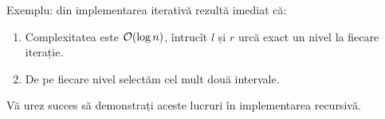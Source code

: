 \documentclass[../main.tex]{subfiles}
\begin{document}
Exemplu: din implementarea iterativă rezultă imediat că:

\begin{enumerate}
  \item  Complexitatea este $\mathcal{O}(\log n)$, întrucît $l$ și $r$ urcă exact un nivel la fiecare iterație.

  \item De pe fiecare nivel selectăm cel mult două intervale.
\end{enumerate}

Vă urez succes să demonstrați aceste lucruri în implementarea recursivă. 
\end{document}

